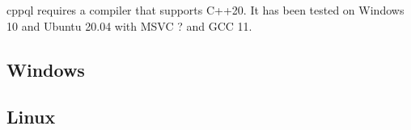 cppql requires a compiler that supports C++20. It has been tested on Windows 10 and Ubuntu 20.04 with MSVC ? and GCC 11.


\subsection{Windows}
\label{section:build:windows}


\subsection{Linux}
\label{section:build:linux}

